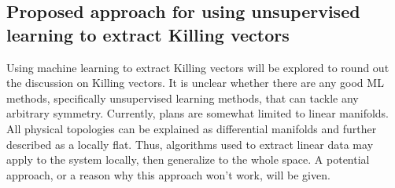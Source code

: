 \documentclass[twoside,11pt]{article}
\begin{document}
\subsection{Proposed approach for using unsupervised learning to extract Killing vectors}
Using machine learning to extract Killing vectors will be explored to round out the discussion on Killing vectors. It is unclear whether there are any good ML methods, specifically unsupervised learning methods, that can tackle any arbitrary symmetry. Currently, plans are somewhat limited to linear manifolds. All physical topologies can be explained as differential manifolds and further described as a locally flat. Thus, algorithms used to extract linear data may apply to the system locally, then generalize to the whole space. A potential approach, or a reason why this approach won't work, will be given. 



\vskip 0.2in

\end{document}
